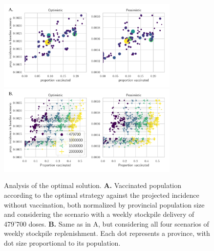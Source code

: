 \begin{figure}[!ht]
\centering
\includegraphics[width=0.8\textwidth]{fig_italy-ocp/figures/scatter_top.pdf}
\includegraphics[width=0.8\textwidth]{fig_italy-ocp/figures/scatter_scn.pdf}
\caption[Analysis of the optimal solution]{Analysis of the optimal solution. \textbf{A.} Vaccinated population according to the optimal strategy against the projected incidence without vaccination, both normalized by provincial population size and considering the scenario with a weekly stockpile delivery of 479'700 doses. \textbf{B.} Same as in A, but considering all four scenarios of weekly stockpile replenishment. Each dot represents a province, with dot size proportional to its population.}
    \label{fig:OC_scatter}
\end{figure}


